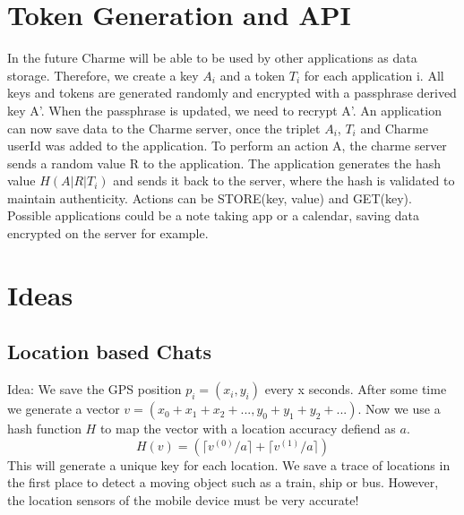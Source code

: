 \documentclass{scrartcl}
\begin{document}
  \section{Token Generation and API}
  In the future Charme will be able to be used by other applications as data storage. Therefore, we create a key $A_i$ and a token $T_i$ for each application i.
All keys and tokens are generated randomly and encrypted with a passphrase derived key A'. When the passphrase is updated, we need to recrypt A'.
An application can now save data to the Charme server, once the triplet $A_i$, $T_i$ and Charme userId was added to the application.
To perform an action A, the charme server sends a random value R to the application. The application generates the hash value $H(A|R|T_i)$ and sends it back to the server, where the hash is validated to maintain authenticity. Actions can be  STORE(key, value) and GET(key). Possible applications could be a note taking app or a calendar, saving data encrypted on the server for example.

\section{Ideas}
  \subsection{Location based Chats}
  Idea: We save the GPS position $p_i = (x_i,y_i)$  every x seconds. After some time
  we generate a vector $v = (x_0+x_1+x_2+..., y_0+y_1+y_2+...)$. Now we use a hash function $H$ to map the vector with a location accuracy defiend as $a$. 
  $$
  H(v) = (\lceil v^{(0)}/a \rceil +\lceil v^{(1)}/a \rceil )
  $$
  This will generate a unique key for each location. We save a trace of locations in the first place to detect a moving object such as a train, ship or bus.  However, the location sensors of the mobile device must be very accurate!
  
  
  
\end{document}

